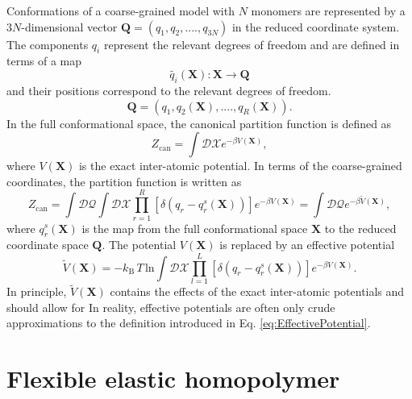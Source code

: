 \documentclass[12pt]{report}
\begin{document}
Conformations of a coarse-grained model with $N$ monomers are represented by a $3N$-dimensional vector  
$\mathbf{Q} = (q_{1},q_{2},....,q_{3N})$ in the reduced coordinate system. The components $q_{i}$ represent the relevant degrees of freedom and are defined in terms of a map 
%
\begin{equation}
\tilde{q_{i}}(\textbf{X}): \textbf{X} \rightarrow \textbf{Q} 
\end{equation}
%
 and their positions correspond to the relevant degrees of freedom.
%
\begin{equation}
\mathbf{Q} = (q_{1},q_{2}(\mathbf{X}),....,q_{R}(\mathbf{X})).
\end{equation}
%
In the full conformational space, the canonical partition function is defined as
%
\begin{equation}
Z_{\mathrm{can}} = \int \mathcal{DX}e^{-\beta V(\mathbf{X})},
\end{equation}
%
where $V(\mathbf{X})$ is the exact inter-atomic potential. In terms of the coarse-grained coordinates, the partition function is written as
%
\begin{equation}
Z_{\mathrm{can}} = \int \mathcal{DQ}\int \mathcal{DX}\prod _{r = 1}^{R} \left[\delta (q_{r} - q_{r}^{s}(\mathbf{X}))\right]e^{-\beta V(\mathbf{X})} = \int \mathcal{DQ}e^{-\beta \tilde{V}(\mathbf{X})},
\end{equation}
where $q_{r}^{s}(\mathbf{X})$ is the map from the full conformational space $\mathbf{X}$ to the reduced coordinate space $\mathbf{Q}$. The potential $V(\mathbf{X})$ is replaced by an effective potential
%
\begin{equation}
\label{eq:EffectivePotential}
\tilde{V}(\mathbf{X}) = -k_{\mathrm{B}}\,T\,\mathrm{ln} \int \mathcal{DX}\prod_{l = 1}^{L} \left[\delta (q_{r} - q_{r}^{s}(\mathbf{X}))\right]e^{-\beta V(\mathbf{X})}.
\end{equation}
%
In principle, $\tilde{V}(\mathbf{X})$ contains the effects of the exact inter-atomic potentials and should allow for 
In reality, effective potentials are often only crude approximations to the definition introduced in Eq. \ref{eq:EffectivePotential}. 

\section{Flexible elastic homopolymer}
\end{document}
